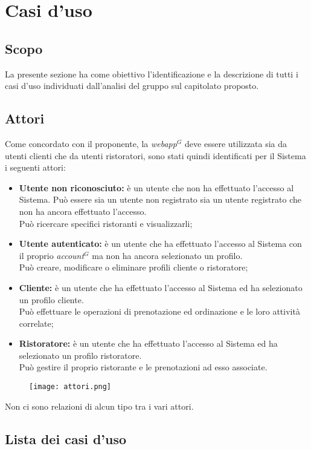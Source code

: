 \nonstopmode
\section{Casi d'uso}
\subsection{Scopo}

La presente sezione ha come obiettivo l'identificazione e la descrizione di tutti i casi d'uso individuati dall'analisi del gruppo sul capitolato proposto.

\subsection{Attori}
Come concordato con il proponente, la \emph{webapp}$^{G}$ deve essere utilizzata sia da utenti clienti che da utenti ristoratori, sono stati quindi identificati per il Sistema i seguenti attori:
\begin{itemize}
    \item \textbf{Utente non riconosciuto:} è un utente che non ha effettuato l'accesso al Sistema. Può essere sia un utente non registrato sia un utente registrato che non ha ancora effettuato l'accesso.\\ Può ricercare specifici ristoranti e visualizzarli;
    \item \textbf{Utente autenticato:} è un utente che ha effettuato l'accesso al Sistema con il proprio \emph{account}$^{G}$ ma non ha ancora selezionato un profilo.\\ Può creare, modificare o eliminare profili cliente o ristoratore;
    \item \textbf{Cliente:} è un utente che ha effettuato l'accesso al Sistema ed ha selezionato un profilo cliente.\\ Può effettuare le operazioni di prenotazione ed ordinazione e le loro attività correlate;
    \item \textbf{Ristoratore:} è un utente che ha effettuato l'accesso al Sistema ed ha selezionato un profilo ristoratore.\\ Può gestire il proprio ristorante e le prenotazioni ad esso associate.
\end{itemize}
\begin{figure}[h] \texttt{[image: attori.png]} \end{figure}

Non ci sono relazioni di alcun tipo tra i vari attori.

\pagebreak
\subsection{Lista dei casi d'uso}









